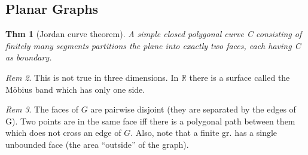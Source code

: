 \documentclass[11pt, fleqn, a4paper, landscape]{article}
\theoremstyle{plain} %
\newtheorem{thm}{Thm}
\theoremstyle{remark} %
\newtheorem{rem}[thm]{Rem}
\theoremstyle{definition} %
\newtheorem{defi}[thm]{Def}
\begin{document}
\begin{multicols}{5}
\section{Planar Graphs}
%
\addtocounter{thm}{2}
\addtocounter{thm}{1}

\addtocounter{thm}{1}
\begin{thm}[Jordan curve theorem]
A simple closed polygonal curve C consisting of finitely
many segments partitions the plane into exactly two faces, each having C as boundary.
\end{thm}

\begin{rem}
This is not true in three dimensions. In $\mathbb{R}$ there is a surface called the Möbius band which has only one side.
\end{rem}

\begin{rem}
The faces of $G$ are pairwise disjoint (they are separated by the edges of G). Two points are in the same face iff there is a polygonal path between them which does not cross an edge of $G$. Also, note that a finite gr. has a single unbounded face (the area “outside” of the graph).
\end{rem}


\end{multicols}
\end{document}
